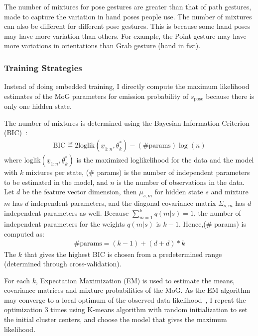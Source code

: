 The number of mixtures for pose gestures are greater than that of path
gestures, made to capture the variation in hand poses people use. The number
of mixtures can also be different for different pose gestures.
This is because some hand poses may have more variation than others.
For example, the Point gesture may have more variations in orientations than
Grab gesture (hand in fist).

\subsubsection{Training Strategies}\label{sec:pose-gesture}
Instead of doing embedded
training, I directly compute the maximum likelihood estimates of the MoG
parameters for emission probability of $s_{\text{pose}}$ because there is only
one hidden state.

The number of mixtures is
determined using the Bayesian Information Criterion (BIC)~\cite{fraley06}:
\begin{align*}
\text{BIC}\eqdef2\text{loglik}(\underline{x}_{1:n}, \underline{\theta}_k^*) -
(\text{\# params})\log(n)
\end{align*}
where $\text{loglik}(\underline{x}_{1:n}, \underline{\theta}_k^*)$ is the
maximized loglikelihood for the data and the model with $k$ mixtures per state, (\# params) is the number of independent parameters to be estimated in the model, and $n$ is the number of observations in
the data. Let $d$ be the feature vector dimension, then $\mu_{s,m}$ for
hidden state $s$ and mixture $m$ has $d$ independent parameters, and the
diagonal covariance matrix $\Sigma_{s,m}$ has $d$ independent parameters as
well. Because $\sum_{m=1}^k q(m | s) = 1$, the number of independent parameters
for the weights $q(m|s)$ is $k - 1$. Hence,(\# params) is computed as:
\begin{align*}
\text{\# params} = (k - 1) + (d + d) * k
\end{align*}
The $k$ that gives the highest BIC is chosen from a predetermined range
(determined through cross-validation).

For each $k$, Expectation Maximization (EM) is used to estimate the means,
covariance matrices and mixture probabilities of the MoG. As the EM algorithm may
converge to a local optimum of the observed data likelihood~\cite{dicintio12}, I
repeat the optimization 3 times using K-means algorithm with random
initialization to set the initial cluster centers, and choose the model that
gives the maximum likelihood.

